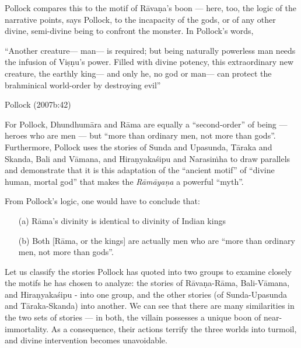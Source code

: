 Pollock compares this to the motif of Rāvaṇa’s boon --- here, too, the logic of the narrative points, says Pollock, to the incapacity of the gods, or of any other divine, semi-divine being to confront the monster. In Pollock’s words,

\begin{myquote}
“Another creature--- man--- is required; but being naturally powerless man needs the infusion of Viṣṇu’s power. Filled with divine potency, this extraordinary new creature, the earthly king--- and only he, no god or man--- can protect the brahminical world-order by destroying evil”

\hfill Pollock (2007b:42)
\end{myquote}

For Pollock, Dhundhumāra and Rāma are equally a “second-order” of being --- heroes who are men --- but “more than ordinary men, not more than gods”. Furthermore, Pollock uses the stories of Sunda and Upasunda, Tāraka and Skanda, Bali and Vāmana, and Hiraṇyakaśipu and Narasiṁha to draw parallels and demonstrate that it is this adaptation of the “ancient motif” of “divine human, mortal god” that makes the {\sl Rāmāyaṇa} a powerful “myth”. 

From Pollock’s logic, one would have to conclude that:\\[-18pt] 
\begin{itemize}
\itemsep=-1pt
\item[(a)] Rāma’s divinity is identical to divinity of Indian kings 
\item[(b)] Both [Rāma, or the kings] are actually men who are “more than ordinary men, not more than gods”.  
\end{itemize}
Let us classify the stories Pollock has quoted into two groups to examine closely the motifs he has chosen to analyze: the stories of Rāvaṇa-Rāma, Bali-Vāmana, and Hiraṇyakaśipu - into one group, and the other stories (of Sunda-Upasunda and Tāraka-Skanda) into another. We can see that there are many similarities in the two sets of stories --- in both, the villain possesses a unique boon of near- immortality. As a consequence, their actions terrify the three worlds into turmoil, and divine intervention becomes unavoidable.


